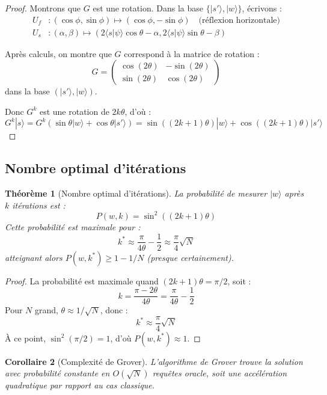 \documentclass[12pt,a4paper]{article}
\newtheorem{theorem}{Théorème}[section]
\newtheorem{corollary}[theorem]{Corollaire}
\theoremstyle{definition}
\theoremstyle{remark}
\begin{document}
\begin{proof}
Montrons que $G$ est une rotation. Dans la base $\{|s'\rangle, |w\rangle\}$, écrivons :
\begin{align*}
U_f &: (\cos\phi, \sin\phi) \mapsto (\cos\phi, -\sin\phi) \quad \text{(réflexion horizontale)} \\
U_s &: (\alpha, \beta) \mapsto (2\langle s | \psi \rangle \cos\theta - \alpha, 2\langle s | \psi \rangle \sin\theta - \beta)
\end{align*}

Après calculs, on montre que $G$ correspond à la matrice de rotation :
\[
G = \begin{pmatrix}
\cos(2\theta) & -\sin(2\theta) \\
\sin(2\theta) & \cos(2\theta)
\end{pmatrix}
\]
dans la base $(|s'\rangle, |w\rangle)$.

Donc $G^k$ est une rotation de $2k\theta$, d'où :
\[
G^k |s\rangle = G^k (\sin\theta |w\rangle + \cos\theta |s'\rangle) = \sin((2k+1)\theta) |w\rangle + \cos((2k+1)\theta) |s'\rangle
\]
\end{proof}

\subsection{Nombre optimal d'itérations}

\begin{theorem}[Nombre optimal d'itérations]
La probabilité de mesurer $|w\rangle$ après $k$ itérations est :
\[
P(w, k) = \sin^2((2k+1)\theta)
\]
Cette probabilité est maximale pour :
\[
k^* \approx \frac{\pi}{4\theta} - \frac{1}{2} \approx \frac{\pi}{4}\sqrt{N}
\]
atteignant alors $P(w, k^*) \geq 1 - 1/N$ (presque certainement).
\end{theorem}

\begin{proof}
La probabilité est maximale quand $(2k+1)\theta = \pi/2$, soit :
\[
k = \frac{\pi - 2\theta}{4\theta} = \frac{\pi}{4\theta} - \frac{1}{2}
\]
Pour $N$ grand, $\theta \approx 1/\sqrt{N}$, donc :
\[
k^* \approx \frac{\pi}{4} \sqrt{N}
\]
À ce point, $\sin^2(\pi/2) = 1$, d'où $P(w, k^*) \approx 1$.
\end{proof}

\begin{corollary}[Complexité de Grover]
L'algorithme de Grover trouve la solution avec probabilité constante en $O(\sqrt{N})$ requêtes oracle, soit une accélération quadratique par rapport au cas classique.
\end{corollary}
\end{document}
